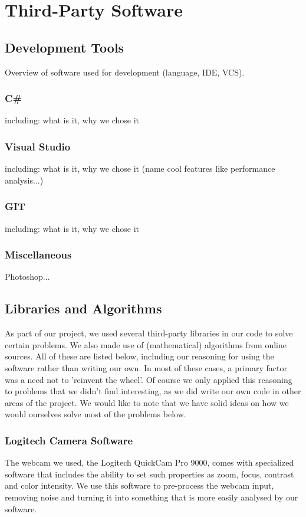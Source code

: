 \documentclass[10pt,twocolumn]{article}
\begin{document}
\section{Third-Party Software}

\subsection{Development Tools}
Overview of software used for development (language, IDE, VCS).

\subsubsection{C\#}
including: what is it, why we chose it

\subsubsection{Visual Studio}
including: what is it, why we chose it (name cool features like performance analysis...)

\subsubsection{GIT}
including: what is it, why we chose it

\subsubsection{Miscellaneous}
Photoshop...

\subsection{Libraries and Algorithms}
As part of our project, we used several third-party libraries in our code to solve certain problems. We also made use of (mathematical) algorithms from online sources. All of these are listed below, including our reasoning for using the software rather than writing our own. In most of these cases, a primary factor was a need not to 'reinvent the wheel'. Of course we only applied this reasoning to problems that we didn't find interesting, as we did write our own code in other areas of the project. We would like to note that we have solid ideas on how we would ourselves solve most of the problems below.

\subsubsection{Logitech Camera Software}
The webcam we used, the Logitech QuickCam Pro 9000, comes with specialized software that includes the ability to set such properties as zoom, focus, contrast and color intensity. We use this software to pre-process the webcam input, removing noise and turning it into something that is more easily analysed by our software.
\end{document}
